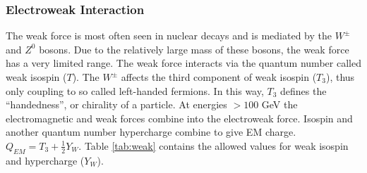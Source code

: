 		\subsubsection{Electroweak Interaction}\label{sssec:Electroweak}
			The weak force is most often seen in nuclear decays and is mediated by the $W^{\pm}$ and $Z^0$ bosons. Due to the relatively large mass of these bosons, the weak force has a very limited range. The weak force interacts via the quantum number called weak isospin ($T$). The $W^{\pm}$ affects the third component of weak isospin ($T_3$), thus only coupling to so called left-handed fermions. In this way, $T_{3}$ defines the ``handedness'', or chirality of a particle. At energies $> 100 $ GeV the electromagnetic and weak forces combine into the electroweak force. Isospin and another quantum number hypercharge combine to give \gls{EM} charge. $Q_{EM} = T_3 + \frac{1}{2} Y_W$. Table \ref{tab:weak} contains the allowed values for weak isospin and hypercharge ($Y_W$). 

